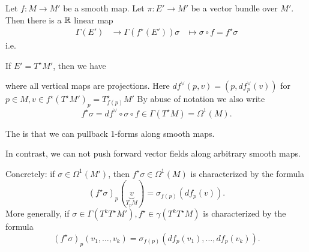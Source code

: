 \begin{definition*}
    Let \(f:M\to M'\) be a smooth map. Let 
    \(\pi:E'\to M'\) be a vector bundle over \(M'\). Then 
    there is a \(\mathbb{R}\) linear map
    \begin{align*}
        \Gamma(E')&\to \Gamma(f^\star(E'))
        \sigma & \mapsto \sigma \circ f = f^\star \sigma
    \end{align*}
    i.e. 
    \begin{center}
    \end{center} 
    If \(E'=T^\star M'\), then we have 
    \begin{center}
    \end{center}
    where all vertical maps are projections.
    Here \(df^\vee(p,v)=(p,df_p^\vee(v))\) for \(p\in M,v\in f^\star(T^\star M')_p=T_{f(p)}^\star M'\)
    By abuse of notation we also write 
    \[f^\star \sigma=df^\vee\circ \sigma \circ f\in \Gamma(T^\star M)=\Omega^1(M).\]
\end{definition*}

The  is that we can pullback 1-forms along smooth maps.

{\color{red} In contrast, we can not push forward vector fields along arbitrary smooth maps.}

Concretely: if \(\sigma \in \Omega^1(M')\), then \(f^\star \sigma\in \Omega^1(M)\) is 
characterized by the formula
\[(f^\star \sigma)_p(\underbrace{v}_{T_pM})=\sigma_{f(p)}(df_p(v)).\]
More generally, if \(\sigma \in \Gamma(T^k T^\star M'), f^\star\in  \gamma(T^k T^\star M)\)
is characterized by the formula 
\[(f^\star \sigma)_p(v_1,\dots,v_k)=\sigma_{f(p)}(df_p(v_1),\dots,df_p(v_k)).\]

